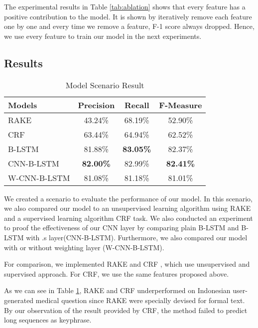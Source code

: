 The experimental results in Table \ref{tab:ablation} shows that every feature has a positive contribution to the model. It is shown by iteratively remove each feature one by one and every time we remove a feature, F-1 score always dropped. Hence, we use every feature to train our model in the next experiments.
\fi
\subsection{Results}
\begin{table}
	\caption{Model Scenario Result}
	\label{tab:model_scenario}
	\begin{tabular}{lccc}
		\toprule
		Models&Precision&Recall&F-Measure\\
		\midrule
		RAKE & 43.24\% & 68.19\% & 52.90\% \\
		
		CRF & 63.44\% & 64.94\% & 62.52\% \\
		
		B-LSTM & 81.88\% & \textbf{83.05\%} & 82.37\% \\
		
		CNN-B-LSTM & \textbf{82.00\%} & 82.99\% & \textbf{82.41\%} \\
		
		W-CNN-B-LSTM & 81.08\% & 81.18\% & 81.01\% \\
		\bottomrule
	\end{tabular}
\end{table}
We created a scenario to evaluate the performance of our model. In this scenario, we also compared our model to an unsupervised learning algorithm using RAKE \cite{rake} and a supervised learning algorithm CRF task. We also conducted an experiment to proof the effectiveness of our CNN layer by comparing plain B-LSTM and B-LSTM with .s layer(CNN-B-LSTM). Furthermore, we also compared our model with or without weighting layer (W-CNN-B-LSTM). 

For comparison, we implemented RAKE \cite{rake} and CRF \cite{zhang2008automatic}, which use unsupervised and supervised approach. For CRF, we use the same features proposed above.

As we can see in Table \ref{tab:model_scenario}, RAKE and CRF underperformed on Indonesian user-generated medical question since RAKE were specially devised for formal text. By our observation of the result provided by CRF, the method failed to predict long sequences as keyphrase.

